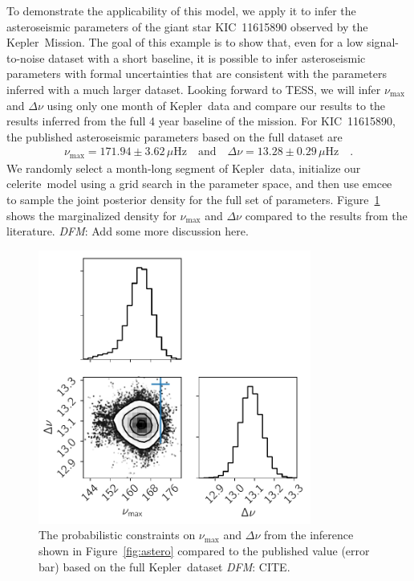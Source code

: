 \documentclass[manuscript, letterpaper]{aastex6}
\newcommand{\project}[1]{\textsf{#1}}
\newcommand{\kepler}{\project{Kepler}}
\newcommand{\tess}{\project{TESS}}
\newcommand{\celerite}{\project{celerite}}
\newcommand{\emcee}{\project{emcee}}
\newcommand{\figureref}[1]{\ref{fig:#1}}
\newcommand{\Figure}[1]{Figure~\figureref{#1}}
\newcommand{\figurelabel}[1]{\label{fig:#1}}
\newcommand{\todo}[3]{{\color{#2}\emph{#1}: #3}}
\newcommand{\dfmtodo}[1]{\todo{DFM}{red}{#1}}
\begin{document}
To demonstrate the applicability of this model, we apply it to infer the
asteroseismic parameters of the giant star KIC~11615890 observed by the
\kepler\ Mission.
The goal of this example is to show that, even for a low signal-to-noise
dataset with a short baseline, it is possible to infer asteroseismic
parameters with formal uncertainties that are consistent with the parameters
inferred with a much larger dataset.
Looking forward to \tess \citep{Campante:2016}, we will infer $\nu_\mathrm{max}$ and $\Delta\nu$
using only one month of \kepler\ data and compare our results to the results
inferred from the full 4 year baseline of the mission.
For KIC~11615890, the published asteroseismic parameters based on the full
dataset are \citep{Pinsonneault:2014}
\begin{eqnarray}
    \nu_\mathrm{max} = 171.94 \pm 3.62 \,\mu\mathrm{Hz} \quad\mathrm{and}\quad
    \Delta\nu = 13.28 \pm 0.29 \,\mu\mathrm{Hz} \quad.
\end{eqnarray}
We randomly select a month-long segment of \kepler\ data, initialize our
\celerite\ model using a grid search in the parameter space, and then use
\emcee\ \citep{Foreman-Mackey:2013} to sample the joint posterior density for
the full set of parameters.
\Figure{astero-corner} shows the marginalized density for $\nu_\mathrm{max}$
and $\Delta\nu$ compared to the results from the literature.
\dfmtodo{Add some more discussion here.}

\begin{figure}[!htbp]
\begin{center}
\includegraphics[width=0.8\textwidth]{figures/astero-11615890-numax_deltanu_corner.pdf}
\caption{The probabilistic constraints on $\nu_\mathrm{max}$ and $\Delta \nu$
    from the inference shown in \Figure{astero} compared to the published
    value (error bar) based on the full \kepler\ dataset \dfmtodo{CITE}.
    \figurelabel{astero-corner}}
\end{center}
\end{figure}
\end{document}
